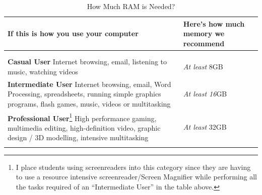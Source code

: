 \documentclass[14pt,letterpaper,twoside]{extreport}
\begin{document}
\begin{longtable}[]{@{}>{\raggedright\arraybackslash}m{}>{\raggedright\arraybackslash}b{}@{}}
	\toprule

	\textbf{If this is how you use your computer}                                                                                                                                                                                                                                                                                                                                                         & \textbf{Here's how much memory we recommend} \\
	\midrule
	\endhead \hline                                                                                                                                                                                                                                                                                                                                                                                                                                      \\
	\multicolumn{2}{r}{\textbf{Continued on Next Page}}                                                                                                                                                                                                                                                                                                                                                                                                  \\
	\endfoot

	\endlastfoot
	\textbf{Casual User} \break Internet browsing, email, listening to music, watching videos                                                                                                                                                                                                                                                                                                             & \emph{At least} 8GB                          \\[2.5em]
	\textbf{Intermediate User} \break Internet browsing, email, Word Processing, spreadsheets, running simple graphics programs, flash games, music, videos or multitasking                                                                                                                                                                                                                               & \emph{At least 16}GB                        \\[2.5em]
	\textbf{Professional User}\footnote{I place students using screenreaders into this category since they are having to use a resource intensive screenreader/Screen Magnifier while performing all the tasks required of an ``Intermediate User'' in the table above.} \break High performance gaming, multimedia editing, high-definition video, graphic design / 3D modelling, intensive multitasking & \emph{At least} 32GB                         \\[2.5em] \hline
	\caption{How Much RAM is Needed?}
\end{longtable}
\end{document}
